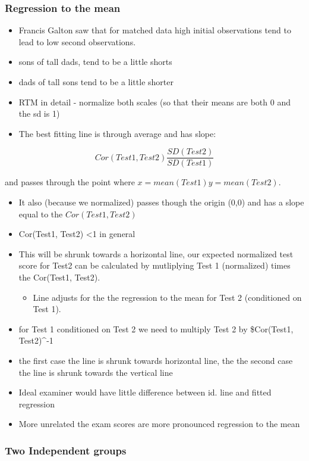 \documentclass[11pt]{article}
\begin{document}
\subsubsection{Regression to the mean}
\label{sec-1-4-2}

\begin{itemize}
\item Francis Galton saw that for matched data high initial observations
  tend to lead to low second observations.
\item sons of tall dads, tend to be a little shorts
\item dads of tall sons tend to be  a little shorter
\item RTM in detail - normalize both scales (so that their means are both
  0 and the sd is 1)
\item The best fitting line is through average and has slope:
\end{itemize}

$$Cor(Test1, Test2) \frac{SD(Test2)}{SD(Test1)} $$

and passes through the point where $x=mean(Test1) y=mean(Test2)$.

\begin{itemize}
\item It also (because we normalized) passes though the origin (0,0) and
  has a slope equal to the $Cor(Test1, Test2)$
\item Cor(Test1, Test2) <1 in general
\item This will be shrunk towards a horizontal line, our expected
  normalized test score for Test2 can be calculated by mutliplying
  Test 1 (normalized) times the Cor(Test1, Test2).
\begin{itemize}
\item Line adjusts for the the regression to the mean for Test 2
   (conditioned on Test 1).
\end{itemize}
\item for Test 1 conditioned on Test 2 we need to multiply Test 2 by
  \$Cor(Test1, Test2)^-1
\item the first case the line is shrunk towards horizontal line, the the
  second case the line is shrunk towards the vertical line
\item Ideal examiner would have little difference between id. line and
  fitted regression
\item More unrelated the exam scores are more pronounced regression to
  the mean
\end{itemize}
\subsubsection{Two Independent groups}
\label{sec-1-4-3}
\end{document}
